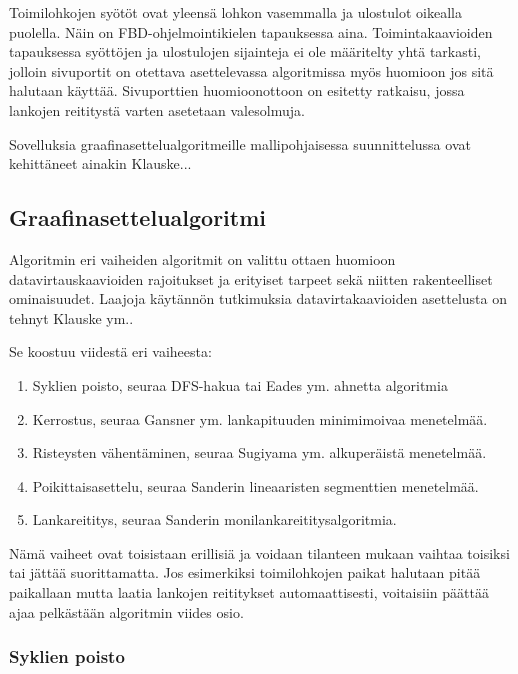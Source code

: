 \documentclass[finnish,12pt]{article}
\begin{document}
Toimilohkojen syötöt ovat yleensä lohkon vasemmalla ja ulostulot oikealla puolella.
Näin on FBD-ohjelmointikielen tapauksessa aina.
Toimintakaavioiden tapauksessa syöttöjen ja ulostulojen sijainteja ei ole määritelty yhtä tarkasti, jolloin sivuportit on otettava asettelevassa algoritmissa myös huomioon jos sitä halutaan käyttää.
Sivuporttien huomioonottoon on esitetty ratkaisu, jossa lankojen reititystä varten asetetaan valesolmuja. \cite{RefWorks:51}

Sovelluksia graafinasettelualgoritmeille mallipohjaisessa suunnittelussa ovat kehittäneet ainakin Klauske...


		\subsection{Graafinasettelualgoritmi}

Algoritmin eri vaiheiden algoritmit on valittu ottaen huomioon datavirtauskaavioiden rajoitukset ja erityiset tarpeet sekä niitten rakenteelliset ominaisuudet. Laajoja käytännön tutkimuksia datavirtakaavioiden asettelusta on tehnyt Klauske ym.\cite{RefWorks:50}.

Se koostuu viidestä eri vaiheesta:
\begin{enumerate}
  \item Syklien poisto, seuraa DFS-hakua \cite{RefWorks:69} tai Eades ym. ahnetta algoritmia \cite{RefWorks:48}
  \item Kerrostus, seuraa Gansner ym. lankapituuden minimimoivaa menetelmää. \cite{RefWorks:28}
  \item Risteysten vähentäminen, seuraa Sugiyama ym. alkuperäistä menetelmää. \cite{RefWorks:9}
  \item Poikittaisasettelu, seuraa Sanderin lineaaristen segmenttien menetelmää. \cite{RefWorks:49}
  \item Lankareititys, seuraa Sanderin monilankareititysalgoritmia. \cite{RefWorks:17}
\end{enumerate}

Nämä vaiheet ovat toisistaan erillisiä ja voidaan tilanteen mukaan vaihtaa toisiksi tai jättää suorittamatta.
Jos esimerkiksi toimilohkojen paikat halutaan pitää paikallaan mutta laatia lankojen reititykset automaattisesti, voitaisiin päättää ajaa pelkästään algoritmin viides osio.

		
		\subsubsection{Syklien poisto}
\end{document}
